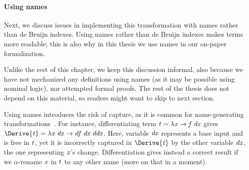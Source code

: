 \paragraph{Using names}
Next, we discuss issues in implementing this transformation with
names rather than de Bruijn indexes. Using names rather than de
Bruijn indexes makes terms more readable; this is also why in
this thesis we use names in our on-paper formalization.

Unlike the rest of this chapter, we keep this discussion informal, also
because we have not mechanized any definitions using names (as it
may be possible using nominal logic), nor attempted formal proofs.
The rest of the thesis does
not depend on this material, so readers might want to skip to
next section.

Using names introduces the risk of capture, as it is common for
name-generating
transformations~\citep{Erdweg2014captureavoiding}. For instance,
differentiating term \ensuremath{\Varid{t}\mathrel{=}\lambda \Varid{x}\to \Varid{f}\;\Varid{dx}} gives \ensuremath{\Derive{\Varid{t}}\mathrel{=}\lambda \Varid{x}\;\Varid{dx}\to \Varid{df}\;\Varid{dx}\;\Varid{ddx}}. Here, variable \ensuremath{\Varid{dx}} represents a base input and is
free in \ensuremath{\Varid{t}}, yet it is incorrectly captured in \ensuremath{\Derive{\Varid{t}}} by the
other variable \ensuremath{\Varid{dx}}, the one representing \ensuremath{\Varid{x}}'s change.
Differentiation gives instead a
correct result if we $\alpha$-rename \ensuremath{\Varid{x}} in \ensuremath{\Varid{t}} to any other
name (more on that in a moment).

